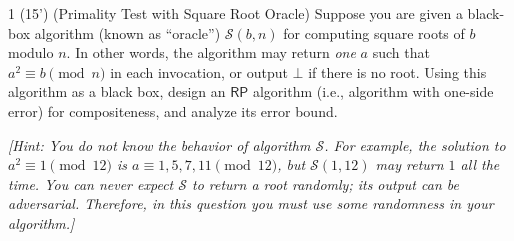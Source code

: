     \begin{question}{1 (15') (Primality Test with Square Root Oracle)}    
		Suppose you are given a black-box algorithm (known as ``oracle'') $\mathcal S(b,n)$ for computing square roots of $b$ modulo $n$. In other words, the algorithm may return \textit{one} $a$ such that $a^2\equiv b\pmod n$ in each invocation, or output $\bot$ if there is no root. Using this algorithm as a black box, design an $\mathsf{RP}$ algorithm (i.e., algorithm with one-side error) for compositeness, and analyze its error bound.
		
		\textit{[Hint: You do not know the behavior of algorithm $\mathcal S$. For example, the solution to $a^2\equiv 1\pmod{12}$ is $a\equiv 1,5,7,11\pmod{12}$, but $\mathcal S(1,12)$ may return $1$ all the time. You can never expect $\mathcal S$ to return a root randomly; its output can be adversarial. Therefore, in this question you must use some randomness in your algorithm.]}
	\end{question}
